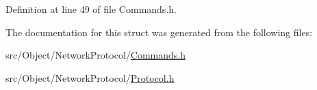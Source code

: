Definition at line 49 of file Commands.h.



The documentation for this struct was generated from the following files:\begin{DoxyCompactItemize}
\item 
src/Object/NetworkProtocol/\hyperlink{_commands_8h}{Commands.h}\item 
src/Object/NetworkProtocol/\hyperlink{_protocol_8h}{Protocol.h}\end{DoxyCompactItemize}
